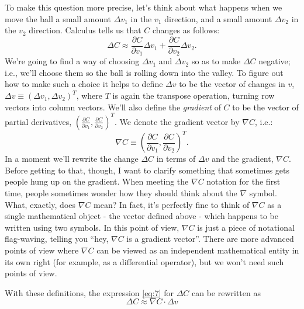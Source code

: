 \documentclass[a4paper,twoside,10pt]{book}
\begin{document}
To make this question more precise, let's think about what happens when we move the ball a small amount $\Delta v_1$ in the $v_1$ direction, and a small amount $\Delta v_2$ in the $v_2$ direction. Calculus tells us that $C$ changes as follows:
\begin{equation}
	\Delta C \approx \frac{\partial C}{\partial v_1} \Delta v_1 + \frac{\partial C}{\partial v_2} \Delta v_2.
	\label{eq:7}
\end{equation}
We're going to find a way of choosing $\Delta v_1$ and $\Delta v_2$ so as to make $\Delta C$ negative; i.e., we'll choose them so the ball is rolling down into the valley. To figure out how to make such a choice it helps to define $\Delta v$ to be the vector of changes in $v$, $\Delta v \equiv (\Delta v_1, \Delta v_2)^T$, where $T$ is again the transpose operation, turning row vectors into column vectors. We'll also define the \textit{gradient} of $C$ to be the vector of partial derivatives, $\left(\frac{\partial
	C}{\partial v_1}, \frac{\partial C}{\partial v_2}\right)^T$. We denote the gradient vector by $\nabla C$, i.e.:
\begin{equation}
\nabla C \equiv \left( \frac{\partial C}{\partial v_1}, \frac{\partial C}{\partial v_2} \right)^T.
\label{eq:8}
\end{equation}
In a moment we'll rewrite the change $\Delta C$ in terms of $\Delta{}v$ and the gradient, $\nabla C$. Before getting to that, though, I want to clarify something that sometimes gets people hung up on the gradient. When meeting the $\nabla C$ notation for the first time, people sometimes wonder how they should think about the $\nabla$ symbol. What, exactly, does $\nabla C$ mean? In fact, it's perfectly fine to think of $\nabla C$ as a single mathematical object - the vector defined above - which happens to be written using two symbols. In this point of view, $\nabla C$ is just a piece of notational flag-waving, telling you ``hey, $\nabla C$ is a gradient vector''. There are more advanced points of view where $\nabla C$ can be viewed as an independent mathematical entity in its own right (for example, as a differential operator), but we won't need such points of view.

With these definitions, the expression \ref{eq:7} for $\Delta C$ can be rewritten as
\begin{equation}
	\Delta C \approx \nabla C \cdot \Delta v
	\label{eq:9}
\end{equation}
\end{document}
